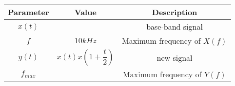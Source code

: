 \begin{tabular}{|c|c|c|}
\hline
\textbf{Parameter} & \textbf{Value} & \textbf{Description}\\
\hline
$x(t)$ & & base-band signal\\
\hline
$f$ & $10kHz$ & Maximum frequency of $X(f)$\\
\hline
$y(t)$ & $x(t)x(1+\dfrac{t}{2})$ & new signal\\
\hline
$f_{max}$ & & Maximum frequency of $Y(f)$\\
\hline
\end{tabular}
